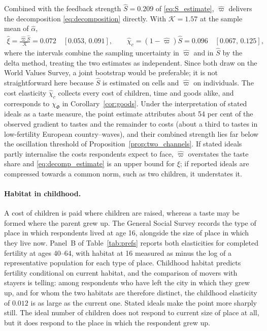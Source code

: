 \documentclass[11pt]{article}
\begin{document}
Combined with the feedback strength $\hat S=0.209$ of \eqref{eq:S_estimate}, $\hat\varpi$ delivers
the decomposition \eqref{eq:decomposition} directly. With $\mathcal{K}=1.57$ at the sample mean
of $\hat\alpha$,
\begin{align}
\hat\xi=\frac{\hat\varpi\hat S}{\mathcal{K}}=0.072\quad[0.053,\,0.091],
\qquad
\hat\chi_c=(1-\hat\varpi)\hat S=0.096\quad[0.067,\,0.125],
\label{eq:decomp_estimate}
\end{align}
where the intervals combine the sampling uncertainty in $\hat\varpi$ and in $\hat S$ by the delta
method, treating the two estimates as independent. Since both draw on the World Values Survey, a joint
bootstrap would be preferable; it is not straightforward here because $\hat S$ is estimated on cells
and $\hat\varpi$ on individuals. The cost elasticity $\hat\chi_c$ collects every cost of children, time
and goods alike, and corresponds to $\chi_\Phi$ in Corollary~\ref{cor:goods}. Under the interpretation
of stated ideals as a taste measure, the point
estimate attributes about 54 per cent of the observed
gradient to tastes and the remainder to costs (about a third to tastes in low-fertility European
country--waves), and their combined strength lies far below the oscillation threshold of
Proposition~\ref{prop:two_channels}. If stated ideals partly internalise the costs respondents
expect to face, $\hat\varpi$ overstates the taste share and \eqref{eq:decomp_estimate} is an upper
bound for $\xi$; if reported ideals are compressed towards a common norm, such as two children, it
understates it.

\paragraph{Habitat in childhood.}
A cost of children is paid where children are raised, whereas a taste may be formed where the
parent grew up. The General Social Survey records the type of place in which respondents lived at
age 16, alongside the size of place in which they live now. Panel~B of Table~\ref{tab:prefs}
reports both elasticities for completed fertility at ages 40--64, with habitat at 16 measured as
minus the log of a representative population for each type of place. Childhood habitat predicts
fertility conditional on current habitat, and the comparison of movers with stayers is telling:
among respondents who have left the city in which they grew up, and for whom the two habitats are
therefore distinct, the childhood elasticity of $0.012$ is as large as the current one. Stated
ideals make the point more sharply still. The ideal number of children does not respond to current
size of place at all, but it does respond to the place in which the respondent grew up.
\end{document}
